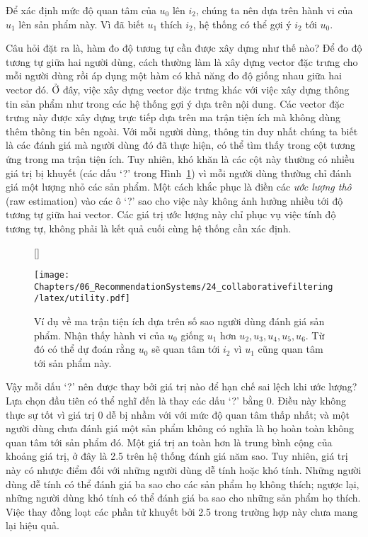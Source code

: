 Để xác định {mức độ quan tâm} của $u_0$ lên $i_2$, chúng
ta nên dựa trên {hành vi} của $u_1$ lên sản phẩm này. Vì đã biết $u_1$ {thích} $i_2$, hệ thống có thể gợi ý $i_2$ tới $u_0$.
 
Câu hỏi đặt ra là, hàm đo độ tương tự cần được xây dựng như thế nào? Để đo độ
tương tự giữa hai người dùng, cách thường làm là xây dựng vector đặc trưng cho
mỗi người dùng rồi áp dụng một hàm có khả năng đo độ giống nhau giữa hai vector
đó. Ở đây, việc xây dựng vector đặc trưng khác với việc xây dựng thông tin sản
phẩm như trong các hệ thống gợi ý dựa trên nội dung. Các vector đặc trưng này
được xây dựng trực tiếp dựa trên ma trận tiện ích mà không dùng thêm thông tin
bên ngoài. Với mỗi người dùng, thông tin duy nhất chúng ta biết là các đánh giá
mà người dùng đó đã thực hiện, có thể tìm thấy trong cột tương ứng trong ma trận
tiện ích. Tuy nhiên, khó khăn là các cột này thường có nhiều giá trị bị khuyết
(các dấu `?' trong Hình~\ref{fig:24_1}) vì mỗi người dùng thường chỉ đánh giá
một lượng nhỏ các sản phẩm. Một cách khắc phục là điền các \textit{ước lượng
thô} (raw estimation) vào các ô `?' sao cho việc này không ảnh hưởng nhiều tới
{độ tương tự} giữa hai vector. Các giá trị ước lượng này chỉ phục vụ việc tính độ
tương tự, không phải là kết quả cuối cùng hệ thống cần xác định.
\begin{figure}[t]
    [\FBwidth]
    {\caption{ 
    Ví dụ về ma trận tiện ích dựa trên số sao người dùng đánh giá
    sản phẩm. Nhận thấy {hành vi} của $u_0$ giống $u_1$ hơn $u_2, u_3, u_4, u_5, u_6$. Từ đó có thể dự đoán rằng $u_0$ sẽ quan tâm tới $i_2$ vì $u_1$ cũng quan tâm tới sản phẩm này.
    }
    \label{fig:24_1}}
    { %
    \texttt{[image: Chapters/06\_RecommendationSystems/24\_collaborativefiltering/latex/utility.pdf]}
    }
\end{figure}
 
Vậy mỗi dấu `?' nên được thay bởi giá trị nào để hạn chế sai lệch khi ước lượng? Lựa chọn đầu tiên có thể nghĩ đến là thay các dấu `?' bằng 0. Điều
này không thực sự tốt vì giá trị 0 dễ bị nhầm với với mức độ quan tâm thấp nhất; và
một người dùng chưa đánh giá một sản phẩm không có nghĩa là họ hoàn toàn không
quan tâm tới sản phẩm đó. Một giá trị {an toàn} hơn là trung bình cộng của khoảng giá trị, ở đây là 2.5 trên hệ thống đánh giá năm sao. Tuy nhiên, giá trị này có
nhược điểm đối với những người dùng {dễ tính} hoặc {khó tính}. Những 
người dùng dễ tính có thể đánh giá ba sao cho các sản phẩm họ không thích;
ngược lại, những người dùng khó tính có thể đánh giá ba sao cho
những sản phẩm họ thích. Việc thay đồng loạt các phần tử khuyết bởi 2.5 trong
trường hợp này chưa mang lại hiệu quả. 

